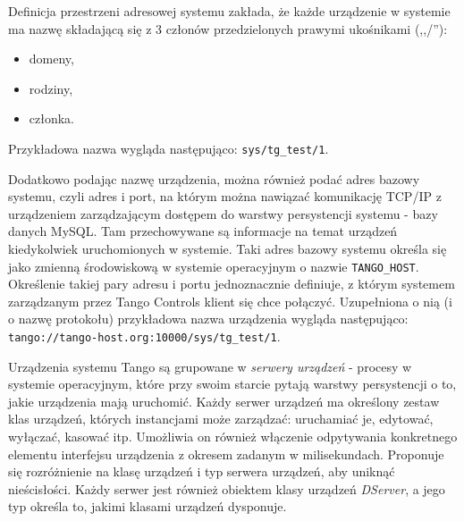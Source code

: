 Definicja przestrzeni adresowej systemu zakłada, że każde urządzenie w systemie ma nazwę składającą się z 3 członów przedzielonych prawymi ukośnikami (,,/''):
\begin{itemize}
    \item domeny,
    \item rodziny,
    \item członka.
\end{itemize}
Przykładowa nazwa wygląda następująco: \texttt{sys/tg\_test/1}.

Dodatkowo podając nazwę urządzenia, można również podać adres bazowy systemu, czyli adres i port, na którym można nawiązać komunikację TCP/IP z urządzeniem zarządzającym dostępem do warstwy persystencji systemu - bazy danych MySQL. Tam przechowywane są informacje na temat urządzeń kiedykolwiek uruchomionych w systemie. Taki adres bazowy systemu określa się jako zmienną środowiskową w systemie operacyjnym o nazwie \texttt{TANGO\_HOST}. Określenie takiej pary adresu i portu jednoznacznie definiuje, z którym systemem zarządzanym przez Tango Controls klient się chce połączyć. Uzupełniona o nią (i o nazwę protokołu) przykładowa nazwa urządzenia wygląda następująco: \texttt{tango://tango-host.org:10000/sys/tg\_test/1}.

Urządzenia systemu Tango są grupowane w \emph{serwery urządzeń} - procesy w systemie operacyjnym, które przy swoim starcie pytają warstwy persystencji o to, jakie urządzenia mają uruchomić. Każdy serwer urządzeń ma określony zestaw klas urządzeń, których instancjami może zarządzać: uruchamiać je, edytować, wyłączać, kasować itp. Umożliwia on również włączenie odpytywania konkretnego elementu interfejsu urządzenia z okresem zadanym w milisekundach. Proponuje się rozróżnienie na klasę urządzeń i typ serwera urządzeń, aby uniknąć nieścisłości. Każdy serwer jest również obiektem klasy urządzeń \emph{DServer}, a jego typ określa to, jakimi klasami urządzeń dysponuje.

